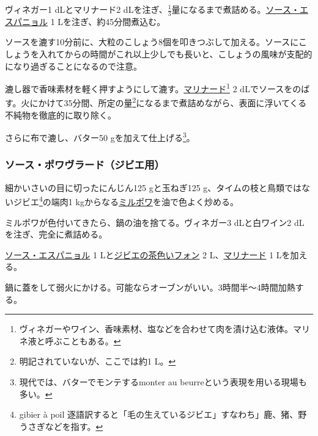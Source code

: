 \begin{recette}
ヴィネガー1 dLとマリナード2
dLを注ぎ、\(\frac{1}{3}\)量になるまで煮詰める。\protect\hyperlink{sauce-espagnole}{ソース・エスパニョル}
1 Lを注ぎ、約45分間煮込む。

ソースを漉す10分前に、大粒のこしょう8個を叩きつぶして加える。ソースにこしょうを入れてからの時間がこれ以上少しでも長いと、こしょうの風味が支配的になり過ぎることになるので注意。

漉し器で香味素材を軽く押すようにして漉す。\protect\hyperlink{marinades-et-saumures}{マリナード}\footnote{ヴィネガーやワイン、香味素材、塩などを合わせて肉を漬け込む液体。マリネ液と呼ぶこともある。}
2 dLでソースをのばす。火にかけて35分間、所定の量\footnote{明記されていないが、ここでは約1
  L。}になるまで煮詰めながら、表面に浮いてくる不純物を徹底的に取り除く。

さらに布で漉し、バター50 gを加えて仕上げる\footnote{現代では、バターでモンテするmonter
  au beurreという表現を用いる現場も多い。}。

\atoaki{}

\hypertarget{sauce-poivrade-pour-gibier}{%
\subsubsection{ソース・ポワヴラード（ジビエ用）}\label{sauce-poivrade-pour-gibier}}



細かいさいの目に切ったにんじん125 gと玉ねぎ125
g、タイムの枝と鳥類ではないジビエ\footnote{gibier à poil
  逐語訳すると「毛の生えているジビエ」すなわち」鹿、猪、野うさぎなどを指す。}の端肉1
kgからなる\protect\hyperlink{mirepoix}{ミルポワ}を油で色よく炒める。

ミルポワが色付いてきたら、鍋の油を捨てる。ヴィネガー3 dLと白ワイン2 dL
を注ぎ、完全に煮詰める。

\protect\hyperlink{sauce-espagnole}{ソース・エスパニョル} 1
Lと\protect\hyperlink{fonds-de-gibier}{ジビエの茶色いフォン} 2
L、\protect\hyperlink{marinades-et-saumures}{マリナード} 1 Lを加える。

鍋に蓋をして弱火にかける。可能ならオーブンがいい。3時間半〜4時間加熱する。


\end{recette}
